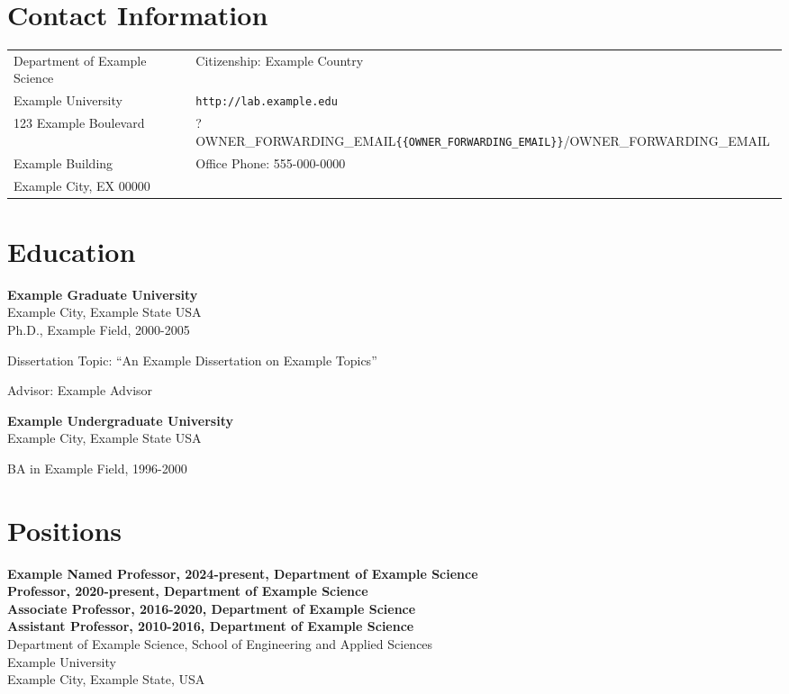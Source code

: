 \begin{resume}

\section{\sc Contact Information}

\vspace{.05in}
\begin{tabular}{@{}p{2.75in}p{4in}}
Department of Example Science & Citizenship: Example Country \\
Example University              & \verb+http://lab.example.edu+\\
123 Example Boulevard                          &{{?OWNER_FORWARDING_EMAIL}}\verb+{{OWNER_FORWARDING_EMAIL}}+{{/OWNER_FORWARDING_EMAIL}}\\
Example Building               & Office Phone: 555-000-0000\\
Example City, EX 00000   & \\
\end{tabular}

\section{\sc Education}

{\bf Example Graduate University}\\
 Example City, Example State USA\\
 Ph.D., Example Field, 2000-2005\\
 \vspace*{-.1in}
 \begin{list2}
\item Dissertation Topic:  ``An Example Dissertation on Example Topics''
\item Advisor: Example Advisor
\end{list2}

\vspace*{-.1in}


{\bf Example Undergraduate University}\\
 Example City, Example State USA\\
\vspace*{-.1in}
\begin{list2}
\item BA in Example Field, 1996-2000
\end{list2}


\section{\sc Positions}
{\bf Example Named Professor, 2024-present, Department of Example Science}\\
{\bf Professor, 2020-present, Department of Example Science}\\
{\bf Associate Professor, 2016-2020, Department of Example Science}\\
{\bf Assistant Professor, 2010-2016, Department of Example Science}\\
Department of Example Science, School of Engineering and Applied Sciences\\
Example University\\
Example City, Example State, USA


\end{resume}
